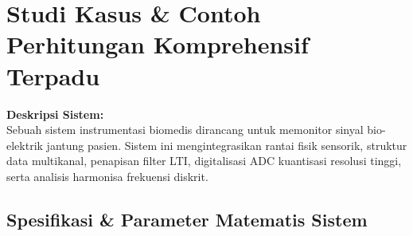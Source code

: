 \documentclass[11pt,a4paper]{article}
\begin{document}
\newpage
\section{Studi Kasus \& Contoh Perhitungan Komprehensif Terpadu}

\begin{studiukasusbox}
\textbf{Deskripsi Sistem:}\\
Sebuah sistem instrumentasi biomedis dirancang untuk memonitor sinyal bio-elektrik jantung pasien. Sistem ini mengintegrasikan rantai fisik sensorik, struktur data multikanal, penapisan filter LTI, digitalisasi ADC kuantisasi resolusi tinggi, serta analisis harmonisa frekuensi diskrit.
\end{studiukasusbox}

\vspace{0.3cm}
\subsection{Spesifikasi \& Parameter Matematis Sistem}
\end{document}

